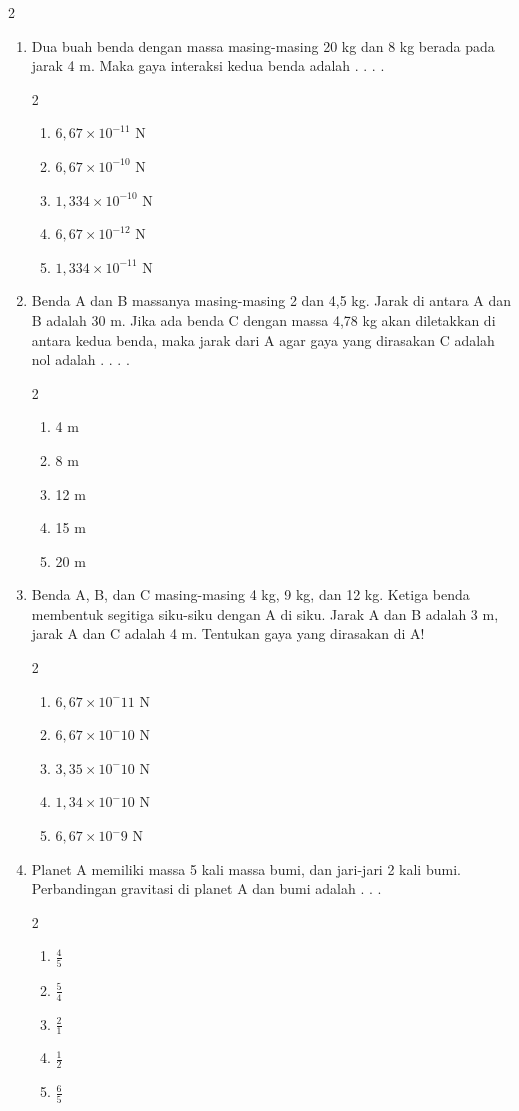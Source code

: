 \documentclass[10pt,a4paper]{article}
\newcommand{\pilgani}[1]{                            \vspace{-0.3cm}\begin{multicols}{2}
 \begin{enumerate}[label=\Alph*., itemsep=0pt,topsep=0pt,leftmargin=*,align=Center]#1                     \end{enumerate}
 \phantom{ini cuma sapi, wedus, dan ayam}
 \end{multicols}}
\begin{document}
\begin{multicols*}{2}

\begin{enumerate}
\item Dua buah benda dengan massa masing-masing 20 kg dan 8 kg berada pada jarak 4 m. Maka gaya interaksi kedua benda adalah . . . .
\pilgani{
    \item $6,67 \times 10^{-11}$ N
    \item $6,67 \times 10^{-10}$ N
    \item $1,334 \times 10^{-10}$ N
    \item $6,67 \times 10^{-12}$ N
    \item $1,334\times 10^{-11}$ N
    }

\vspace{1cm}
\item Benda A dan B massanya masing-masing 2 dan 4,5 kg. Jarak di antara A dan B adalah 30 m. Jika ada benda C dengan massa 4,78 kg akan diletakkan di antara kedua benda, maka jarak dari A agar gaya yang dirasakan C adalah nol adalah . . . . 
\pilgani{
    \item 4 m
    \item 8 m
    \item 12 m
    \item 15 m
    \item 20 m
    }
\vspace{3cm}

\item Benda A, B, dan C masing-masing 4 kg, 9 kg, dan 12 kg. Ketiga benda membentuk segitiga siku-siku dengan A di siku. Jarak A dan B adalah 3 m, jarak A dan C adalah 4 m. Tentukan gaya yang dirasakan di A!
\pilgani{
    \item $6,67 \times 10^-11$ N
    \item $6,67 \times 10^-10$ N
    \item $3,35 \times 10^-10$ N
    \item $1,34 \times 10^-10$ N
    \item $6,67 \times 10^-9$ N
}
\vspace{3cm}

\item Planet A memiliki massa 5 kali massa bumi, dan jari-jari 2 kali bumi. Perbandingan gravitasi di planet A dan bumi adalah . . . 
\pilgani{
    \item $\frac{4}{5}$
    \item $\frac{5}{4}$
    \item $\frac{2}{1}$
    \item $\frac{1}{2}$
    \item $\frac{6}{5}$
}
\vspace{3cm}


\end{enumerate}
\end{multicols*}
\end{document}
